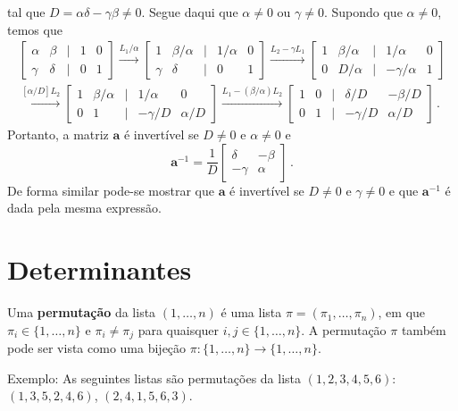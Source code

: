 \documentclass[12pt,a4paper]{report}
\newcommand{\mb}{\mathbf}
\begin{document}
\begin{enumerate}
 tal que $D=\alpha\delta-\gamma\beta\ne 0$. Segue daqui que $\alpha\ne 0$ ou $\gamma\ne 0$. Supondo que $\alpha\ne 0$, temos que
 \begin{multline*}
   \begin{bmatrix}
     \alpha&\beta&|&1&0\\
     \gamma&\delta&|&0&1
   \end{bmatrix}\xrightarrow{L_1/\alpha}\begin{bmatrix}
     1&\beta/\alpha&|&1/\alpha&0\\
     \gamma&\delta&|&0&1
   \end{bmatrix}\xrightarrow{L_2-\gamma L_1}\begin{bmatrix}
     1&\beta/\alpha&|&1/\alpha&0\\
     0&D/\alpha&|&-\gamma/\alpha&1
   \end{bmatrix}\\
   \xrightarrow{[\alpha/D]L_2}\begin{bmatrix}
     1&\beta/\alpha&|&1/\alpha&0\\
     0&1&|&-\gamma/D&\alpha/D
   \end{bmatrix}\xrightarrow{L_1-(\beta/\alpha)L_2}\begin{bmatrix}
     1&0&|&\delta/D&-\beta/D\\
     0&1&|&-\gamma/D&\alpha/D
   \end{bmatrix}\,.
 \end{multline*}
 Portanto, a matriz $\mb a$ é invertível se $D\ne 0$ e $\alpha\ne 0$ e
 $$\mb a^{-1}=\frac{1}{D}\begin{bmatrix}
   \delta&-\beta\\
   -\gamma&\alpha
 \end{bmatrix}\,.$$
 De forma similar pode-se mostrar que $\mb a$ é invertível se $D\ne 0$ e $\gamma\ne 0$ e que $\mb a^{-1}$ é dada pela mesma expressão.
\end{enumerate}

\chapter{Determinantes}

Uma \textbf{permutação} da lista $(1,\ldots,n)$ é uma lista $\pi=(\pi_1,\ldots,\pi_n)$, em que $\pi_i\in\{1,\ldots,n\}$ e $\pi_{i}\ne \pi_j$ para quaisquer $i,j\in\{1,\ldots,n\}$. A permutação $\pi$ também pode ser vista como uma bijeção $\pi:\{1,\ldots,n\}\to\{1,\ldots,n\}$.

Exemplo: As seguintes listas são permutações da lista $(1,2,3,4,5,6)$: $(1,3,5,2,4,6)$, $(2,4,1,5,6,3)$.
\end{document}
